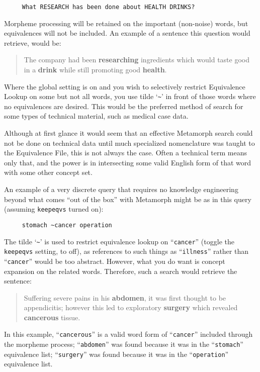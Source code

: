 \begin{verbatim}
     What RESEARCH has been done about HEALTH DRINKS?
\end{verbatim}

Morpheme processing will be retained on the important (non-noise)
words, but equivalences will not be included.  An example of a
sentence this question would retrieve, would be:

\begin{quote}
The company had been {\bf researching} ingredients which would taste
good in a {\bf drink} while still promoting good {\bf health}.
\end{quote}

Where the global setting is on and you wish to selectively restrict
Equivalence Lookup on some but not all words, you use tilde `\verb`~`'
in front of those words where no equivalences are desired.  This would
be the preferred method of search for some types of technical
material, such as medical case data.

Although at first glance it would seem that an effective Metamorph
search could not be done on technical data until much specialized
nomenclature was taught to the Equivalence File, this is not always
the case.  Often a technical term means only that, and the power is in
intersecting some valid English form of that word with some other
concept set.

An example of a very discrete query that requires no knowledge
engineering beyond what comes ``out of the box'' with Metamorph might
be as in this query (assuming \verb`keepeqvs` turned on):

\begin{verbatim}
     stomach ~cancer operation
\end{verbatim}

The tilde `\verb`~`' is used to restrict equivalence lookup on
``\verb`cancer`'' (toggle the \verb`keepeqvs` setting, to off), as
references to such things as ``\verb`illness`'' rather than
``\verb`cancer`'' would be too abstract.  However, what you do want is
concept expansion on the related words.  Therefore, such a search
would retrieve the sentence:

\begin{quote}
     Suffering severe pains in his {\bf abdomen}, it was first thought to be
     appendicitis; however this led to exploratory {\bf surgery} which revealed
     {\bf cancerous} tissue.
\end{quote}

In this example, ``\verb`cancerous`'' is a valid word form of
``\verb`cancer`'' included through the morpheme process;
``\verb`abdomen`'' was found because it was in the ``\verb`stomach`''
equivalence list; ``\verb`surgery`'' was found because it was in the
``\verb`operation`'' equivalence list.


